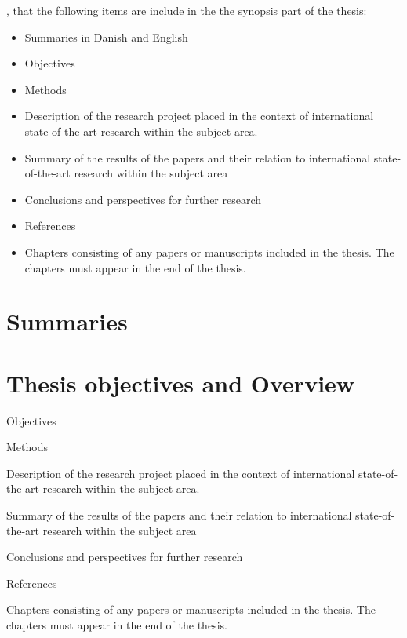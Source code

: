 









, that the following items are include
in the the synopsis part of the thesis:

\begin{itemize}
    \item Summaries in Danish and English 
    \item Objectives
    \item Methods
    \item Description of the research project 
    placed in the context of international state-of-the-art research
    within the subject area.
    \item Summary of the results of the papers 
    and their relation to international state-of-the-art research
    within the subject area
    \item Conclusions and perspectives for further research
    \item References
    \item Chapters consisting of
    any papers or manuscripts included in the thesis. 
    The chapters must appear in the end of the thesis.
\end{itemize}




\chapter{Summaries}



\chapter{Thesis objectives and Overview}

    \item Objectives
    \item Methods
    \item Description of the research project 
    placed in the context of international state-of-the-art research
    within the subject area.
    \item Summary of the results of the papers 
    and their relation to international state-of-the-art research
    within the subject area
    \item Conclusions and perspectives for further research
    \item References
    \item Chapters consisting of
    any papers or manuscripts included in the thesis. 
    The chapters must appear in the end of the thesis.

